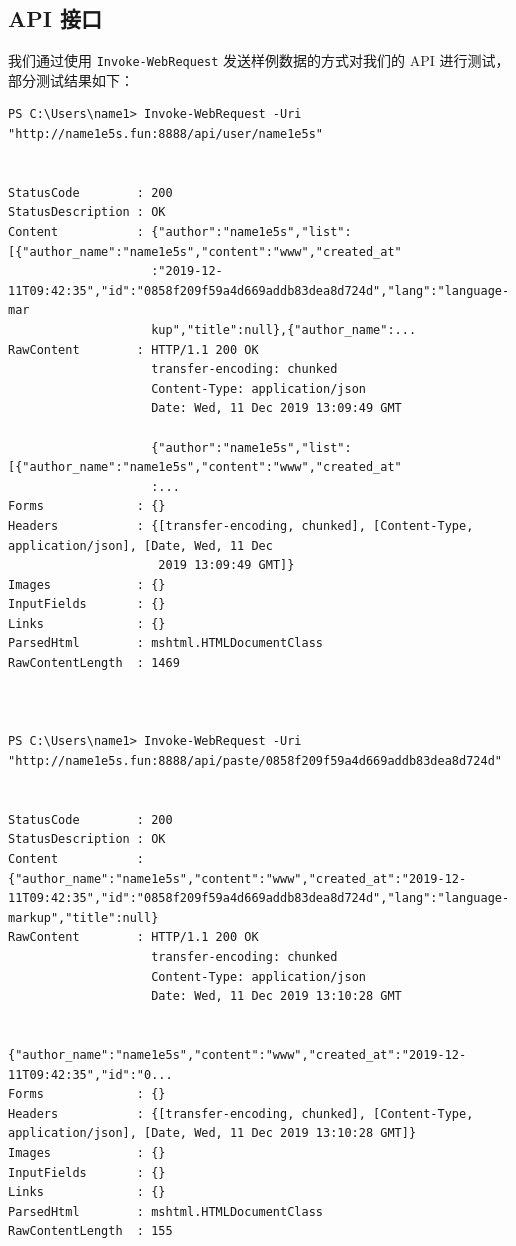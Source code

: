 \documentclass[ichigo,normal,cn]{elegantnote}
\newcommand{\code}[1]{\colorbox{light-gray}{\texttt{#1}}}
\begin{document}
\subsection{API 接口}
我们通过使用 \code{Invoke-WebRequest} 发送样例数据的方式对我们的 API 进行测试，部分测试结果如下：
\begin{lstlisting}
PS C:\Users\name1> Invoke-WebRequest -Uri "http://name1e5s.fun:8888/api/user/name1e5s"


StatusCode        : 200
StatusDescription : OK
Content           : {"author":"name1e5s","list":[{"author_name":"name1e5s","content":"www","created_at"
                    :"2019-12-11T09:42:35","id":"0858f209f59a4d669addb83dea8d724d","lang":"language-mar
                    kup","title":null},{"author_name":...
RawContent        : HTTP/1.1 200 OK
                    transfer-encoding: chunked
                    Content-Type: application/json
                    Date: Wed, 11 Dec 2019 13:09:49 GMT

                    {"author":"name1e5s","list":[{"author_name":"name1e5s","content":"www","created_at"
                    :...
Forms             : {}
Headers           : {[transfer-encoding, chunked], [Content-Type, application/json], [Date, Wed, 11 Dec
                     2019 13:09:49 GMT]}
Images            : {}
InputFields       : {}
Links             : {}
ParsedHtml        : mshtml.HTMLDocumentClass
RawContentLength  : 1469



PS C:\Users\name1> Invoke-WebRequest -Uri "http://name1e5s.fun:8888/api/paste/0858f209f59a4d669addb83dea8d724d"


StatusCode        : 200
StatusDescription : OK
Content           : {"author_name":"name1e5s","content":"www","created_at":"2019-12-11T09:42:35","id":"0858f209f59a4d669addb83dea8d724d","lang":"language-markup","title":null}
RawContent        : HTTP/1.1 200 OK
                    transfer-encoding: chunked
                    Content-Type: application/json
                    Date: Wed, 11 Dec 2019 13:10:28 GMT

                    {"author_name":"name1e5s","content":"www","created_at":"2019-12-11T09:42:35","id":"0...
Forms             : {}
Headers           : {[transfer-encoding, chunked], [Content-Type, application/json], [Date, Wed, 11 Dec 2019 13:10:28 GMT]}
Images            : {}
InputFields       : {}
Links             : {}
ParsedHtml        : mshtml.HTMLDocumentClass
RawContentLength  : 155
\end{lstlisting}
\end{document}
